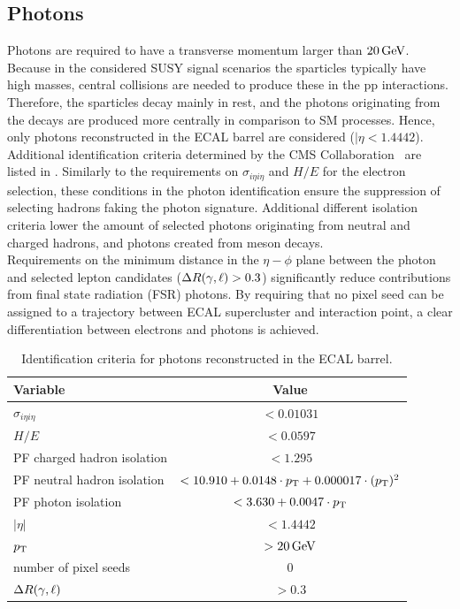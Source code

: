 \subsection{Photons}
Photons are required to have a transverse momentum larger than $20\,\text{Ge\hspace{-.08em}V}$. Because in the considered SUSY signal scenarios the sparticles typically have high masses, central collisions are needed to produce these in the pp interactions. Therefore, the sparticles decay mainly in rest, and the photons originating from the decays are produced more centrally in comparison to SM processes. Hence, only photons reconstructed in the ECAL barrel are considered ($|\eta<1.4442$). Additional identification criteria determined by the CMS Collaboration~\cite{photonID} are listed in .
Similarly to the requirements on $\sigma_{i\eta i\eta}$ and $H/E$ for the electron selection, these conditions in the photon identification ensure the suppression of selecting hadrons faking the photon signature. Additional different isolation criteria lower the amount of selected photons originating from neutral and charged hadrons, and photons created from meson decays.\\
Requirements on the minimum distance in the $\eta-\phi$ plane between the photon and selected lepton candidates ($\Delta R(\gamma,\ell)>0.3$) significantly reduce contributions from final state radiation (FSR) photons. By requiring that no pixel seed can be assigned to a trajectory between ECAL supercluster and interaction point, a clear differentiation between electrons and photons is achieved.
\begin{table}[b]
 \centering
 \caption{Identification criteria for photons reconstructed in the ECAL barrel.}
 \label{tab:photonID}
 \begin{tabular}{lc}
  Variable                    & Value                                                \\\hline
  $\sigma_{i\eta i\eta}$      & $<0.01031$                                           \\
  $H/E$                       & $<0.0597$                                            \\
  PF charged hadron isolation & $<1.295$                                             \\
  PF neutral hadron isolation & $<10.910 + 0.0148 \cdot p_{\mathrm{T}} + 0.000017\cdot (p_{\mathrm{T}})^2$ \\
  PF photon isolation         & $<3.630+0.0047\cdot p_{\mathrm{T}}$                             \\\hline
  $|\eta|$                    & $<1.4442$                                            \\
  $p_{\mathrm{T}}$                       & $>20\,\text{Ge\hspace{-.08em}V}$                                            \\
  number of pixel seeds       & $0$                                                  \\
  $\Delta R (\gamma,\ell)$      & $>0.3$                                               \\\hline
 \end{tabular}
 \vspace{\baselineskip}
\end{table}
